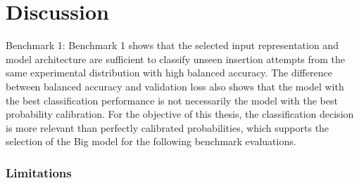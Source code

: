 \chapter{Discussion}\label{ch:discussion}

Benchmark 1:
Benchmark 1 shows that the selected input representation and model architecture are sufficient to classify unseen insertion attempts from the same experimental distribution with high balanced accuracy. The difference between balanced accuracy and validation loss also shows that the model with the best classification performance is not necessarily the model with the best probability calibration. For the objective of this thesis, the classification decision is more relevant than perfectly calibrated probabilities, which supports the selection of the Big model for the following benchmark evaluations.

\subsection{Limitations}
